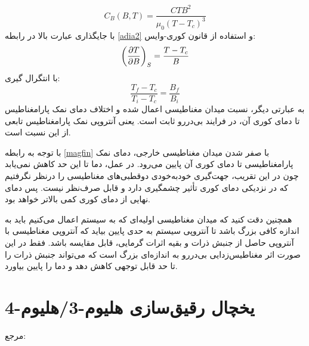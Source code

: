 \documentclass[12pt,a4paper]{article}
\newcommand\pdvc[3]{\qty(\pdv{#1}{#2})_{#3}}
\begin{document}
	\begin{equation}
		C_B(B, T) = \frac{C T B^2}{\mu_0(T-T_c)^3}
	\end{equation}
	با جایگذاری عبارت بالا در رابطه \eqref{adia2} و استفاده از قانون کوری-وایس:
	\begin{equation}
		\pdvc{T}{B}{S} = \frac{T-T_c}{B}
	\end{equation}
	با انتگرال گیری:
	\begin{equation} \label{magfin}
		\frac{T_f-T_c}{T_i-T_c} = \frac{B_f}{B_i}
	\end{equation}
	به عبارتی دیگر، نسبت میدان مغناطیسی اعمال شده و اختلاف دمای نمک پارامغناطیس تا دمای کوری آن، در فرایند بی‌دررو ثابت است.
	یعنی آنتروپی نمک پارامغناطیس تابعی از این نسبت است.
	
	با توجه به رابطه \eqref{magfin} با صفر شدن میدان مغناطیسی خارجی، دمای نمک پارامغناطیسی تا دمای کوری آن پایین می‌رود.
	در عمل، دما تا این حد کاهش نمی‌یابد چون در این تقریب، جهت‌گیری خودبه‌خودی دوقطبی‌های مغناطیسی را درنظر نگرفتیم که در نزدیکی دمای کوری
	تأثیر چشمگیری دارد و قابل صرف‌نظر نیست. پس دمای نهایی از دمای کوری کمی بالاتر خواهد بود.
	
	همچنین دقت کنید که میدان مغناطیسی اولیه‌ای که به سیستم اعمال می‌کنیم باید به اندازه کافی بزرگ باشد تا آنتروپی سیستم به حدی پایین بیاید که
	آنتروپی مغناطیسی با آنتروپی حاصل از جنبش ذرات و بقیه اثرات گرمایی، قابل مقایسه باشد.
	فقط در این صورت اثر مغناطیس‌زدایی بی‌دررو به اندازه‌ای بزرگ است که می‌تواند جنبش ذرات را تا حد قابل توجهی کاهش دهد و دما را پایین بیاورد.
	\section{یخچال رقیق‌سازی هلیوم-3/هلیوم-4}
	مرجع: \cite{pobell2007matter}
	
\end{document}
